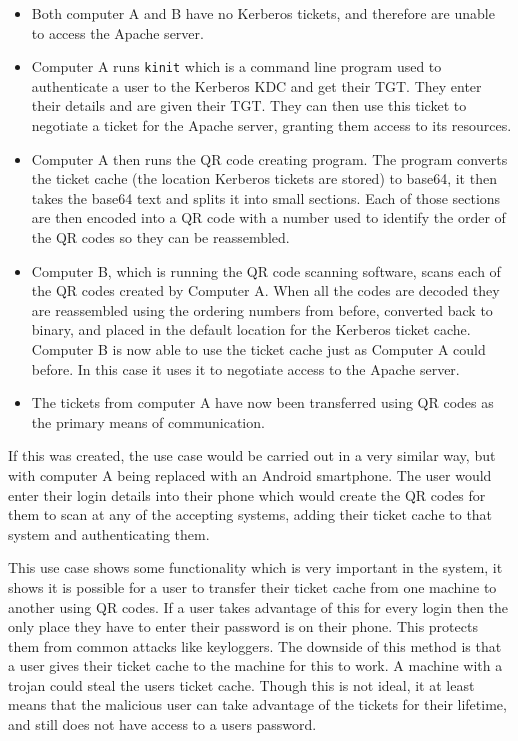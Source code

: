 \documentclass[]{report}   %
\begin{document}
\begin{itemize}
    \item Both computer A and B have no Kerberos tickets, and therefore are unable to access the Apache server.
    \item Computer A runs \texttt{kinit} which is a command line program used to authenticate a user to the Kerberos KDC and get their TGT. They enter their details and are given their TGT. They can then use this ticket to negotiate a ticket for the Apache server, granting them access to its resources.
    \item Computer A then runs the QR code creating program. The program converts the ticket cache (the location Kerberos tickets are stored) to base64, it then takes the base64 text and splits it into small sections. Each of those sections are then encoded into a QR code with a number used to identify the order of the QR codes so they can be reassembled.
    \item Computer B, which is running the QR code scanning software, scans each of the QR codes created by Computer A. When all the codes are decoded they are reassembled using the ordering numbers from before, converted back to binary, and placed in the default location for the Kerberos ticket cache. Computer B is now able to use the ticket cache just as Computer A could before. In this case it uses it to negotiate access to the Apache server.
    \item The tickets from computer A have now been transferred using QR codes as the primary means of communication.
\end{itemize}

If this was created, the use case would be carried out in a very similar way, but with computer A being replaced with an Android smartphone. The user would enter their login details into their phone which would create the QR codes for them to scan at any of the accepting systems, adding their ticket cache to that system and authenticating them.

This use case shows some functionality which is very important in the system, it shows it is possible for a user to transfer their ticket cache from one machine to another using QR codes. If a user takes advantage of this for every login then the only place they have to enter their password is on their phone. This protects them from common attacks like keyloggers. The downside of this method is that a user gives their ticket cache to the machine for this to work. A machine with a trojan could steal the users ticket cache. Though this is not ideal, it at least means that the malicious user can take advantage of the tickets for their lifetime, and still does not have access to a users password.
\end{document}
